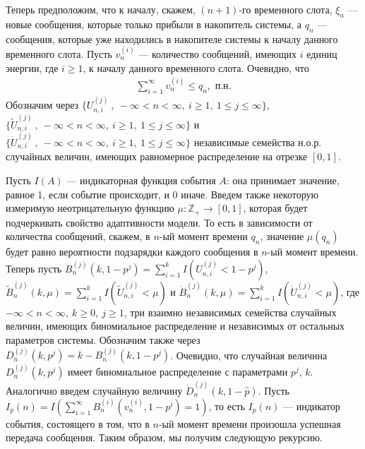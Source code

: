 \documentclass[10pt, reqno]{amsart}
\begin{document}
Теперь предположим, что к началу, скажем, $(n + 1)$-го временного слота, $\xi_{n}$ --- новые сообщения, которые только прибыли в накопитель системы, а $q_{n}$ --- сообщения, которые уже находились в накопителе системы к началу данного временного слота. Пусть $v^{(i)}_{n}$ --- количество сообщений, имеющих $i$ единиц энергии, где $i \geq 1$, к началу данного временного слота. Очевидно, что
\begin{align*}
    \sum_{i=1}^{\infty}v^{(i)}_{n} \leq q_{n}, \text{ п.н.}
\end{align*}
Обозначим через $\{U^{(j)}_{n,i}\:, \:-\infty < n < \infty,\: i \geq 1,\: 1 \leq j \leq \infty\}$, $\{\widetilde{U}^{(j)}_{n,i}\:,\: -\infty < n < \infty,\: i \geq 1,\: 1 \leq j \leq \infty\}$ и $\{\dot{U}^{(j)}_{n,i}\:,\: -\infty < n < \infty,\: i \geq 1,\: 1 \leq j \leq \infty\}$ независимые семейства н.о.р. случайных величин, имеющих равномерное распределение на отрезке $[0, 1]$. 

Пусть $I(A)$ --- индикаторная функция события $A$: она принимает значение, равное 1, если событие происходит, и 0 иначе. Введем также некоторую измеримую неотрицательную функцию $\mu:\mathbb{Z}_{+} \to [0,1]$, которая будет подчеркивать свойство адаптивности модели. То есть в зависимости от количества сообщений, скажем, в $n$-ый момент времени $q_{n}$, значение $\mu(q_{n})$ будет равно вероятности подзарядки каждого сообщения в $n$-ый момент времени. Теперь пусть $B^{(j)}_{n}(k, 1-p^{j}) = \sum_{i=1}^{k}I(U^{(j)}_{n,i} < 1-p^{j})$, $\widetilde{B}^{(j)}_{n}(k, \mu) = \sum_{i=1}^{k}I(\widetilde{U}^{(j)}_{n,i} < \mu)$ и $\dot{B}^{(j)}_{n}(k, \mu) = \sum_{i=1}^{k}I(\dot{U}^{(j)}_{n,i} < \mu)$, где  $-\infty < n < \infty,\: k \geq 0,\: j \geq 1$, три взаимно независимых семейства случайных величин, имеющих биномиальное распределение и независимых от остальных параметров системы. Обозначим также через $D^{(j)}_{n}(k, p^{j}) = k - B^{(j)}_{n}(k, 1-p^{j})$. Очевидно, что случайная величина $D^{(j)}_{n}(k, p^{j})$ имеет биномиальное распределение с параметрами $p^{j}$, $k$. Аналогично введем случайную величину $\dot{D}^{(j)}_{n}(k, 1 - \hat{p})$. Пусть $I_{p}(n) = I(\sum_{i=1}^{\infty}B_{n}^{(i)}(v_{n}^{(i)}, 1-p^{i}) = 1)$, то есть $I_{p}(n)$ --- индикатор события, состоящего в том, что в $n$-ый момент времени произошла успешная передача сообщения. Таким образом, мы получим следующую рекурсию.
\end{document}
